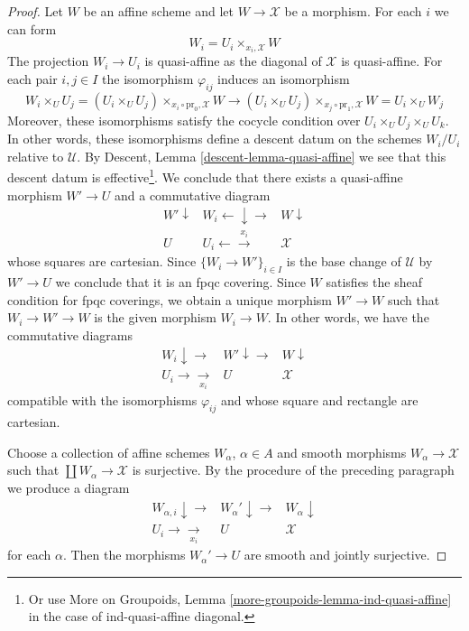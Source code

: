 \begin{proof}
\medskip\noindent
Let $W$ be an affine scheme and let $W \to \mathcal{X}$
be a morphism. For each $i$ we can form
$$
W_i = U_i \times_{x_i, \mathcal{X}} W
$$
The projection $W_i \to U_i$ is quasi-affine as the
diagonal of $\mathcal{X}$ is quasi-affine. For each pair
$i, j \in I$ the isomorphism $\varphi_{ij}$ induces
an isomorphism
$$
W_i \times_U U_j =
(U_i \times_U U_j) \times_{x_i \circ \text{pr}_0, \mathcal{X}} W
\to
(U_i \times_U U_j) \times_{x_j \circ \text{pr}_1, \mathcal{X}} W =
U_i \times_U W_j
$$
Moreover, these isomorphisms satisfy the cocycle condition over
$U_i \times_U U_j \times_U U_k$. In other words, these isomorphisms
define a descent datum on the schemes $W_i/U_i$ relative to $\mathcal{U}$.
By Descent, Lemma \ref{descent-lemma-quasi-affine}
we see that this descent datum is effective\footnote{Or use
More on Groupoids, Lemma \ref{more-groupoids-lemma-ind-quasi-affine}
in the case of ind-quasi-affine diagonal.}.
We conclude that there exists a quasi-affine morphism
$W' \to U$ and a commutative diagram
$$
\begin{array}{ccc}W' \downarrow & W_i \longleftarrow\downarrow\longrightarrow & W \downarrow \\ U & U_i \longleftarrow\overset{x_i}{\longrightarrow} & \mathcal{X}\end{array}
$$
whose squares are cartesian. Since $\{W_i \to W'\}_{i \in I}$
is the base change of $\mathcal{U}$ by $W' \to U$ we conclude
that it is an fpqc covering. Since $W$ satisfies the sheaf
condition for fpqc coverings, we obtain a unique morphism
$W' \to W$ such that $W_i \to W' \to W$ is the given morphism
$W_i \to W$. In other words, we have the commutative diagrams
$$
\begin{array}{ccc}W_i \downarrow\longrightarrow & W' \downarrow\longrightarrow & W \downarrow \\ U_i \longrightarrow\underset{x_i}{\longrightarrow} & U & \mathcal{X}\end{array}
$$
compatible with the isomorphisms $\varphi_{ij}$ and whose
square and rectangle are cartesian.

\medskip\noindent
Choose a collection of affine schemes $W_\alpha$, $\alpha \in A$
and smooth morphisms $W_\alpha \to \mathcal{X}$ such that
$\coprod W_\alpha \to \mathcal{X}$ is surjective.
By the procedure of the preceding paragraph we produce
a diagram
$$
\begin{array}{ccc}W_{\alpha, i} \downarrow\longrightarrow & W_\alpha' \downarrow\longrightarrow & W_\alpha \downarrow \\ U_i \longrightarrow\underset{x_i}{\longrightarrow} & U & \mathcal{X}\end{array}
$$
for each $\alpha$. Then the morphisms $W_\alpha' \to U$ are
smooth and jointly surjective.


\end{proof}
